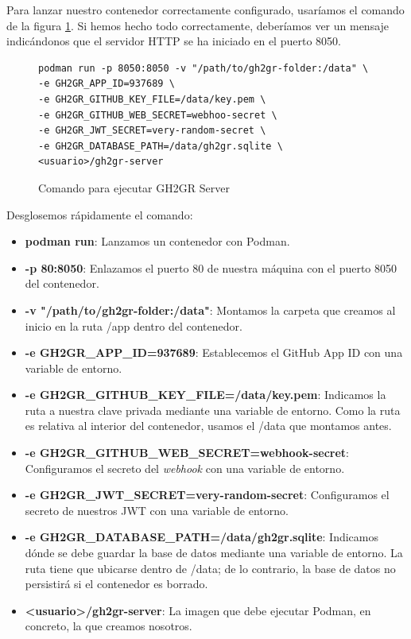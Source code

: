 \begin{sloppypar}
Para lanzar nuestro contenedor correctamente configurado, usaríamos el comando de la figura \ref{fig:run-server}. Si hemos hecho todo correctamente, deberíamos ver un mensaje indicándonos que el servidor \acrshort{HTTP} se ha iniciado en el puerto 8050.
\end{sloppypar}


\begin{figure}[H]
\begin{verbatim}
podman run -p 8050:8050 -v "/path/to/gh2gr-folder:/data" \
-e GH2GR_APP_ID=937689 \
-e GH2GR_GITHUB_KEY_FILE=/data/key.pem \
-e GH2GR_GITHUB_WEB_SECRET=webhoo-secret \
-e GH2GR_JWT_SECRET=very-random-secret \
-e GH2GR_DATABASE_PATH=/data/gh2gr.sqlite \
<usuario>/gh2gr-server
\end{verbatim}
\caption{Comando para ejecutar GH2GR Server}
\label{fig:run-server}
\end{figure}

Desglosemos rápidamente el comando:
\begin{itemize}
    \item \textbf{podman run}: Lanzamos un contenedor con Podman.
    \item \textbf{-p 80:8050}: Enlazamos el puerto 80 de nuestra máquina con el puerto 8050 del contenedor.
    \item \textbf{-v "/path/to/gh2gr-folder:/data"}: Montamos la carpeta que creamos al inicio en la ruta /app dentro del contenedor.
    \item \textbf{-e GH2GR\_APP\_ID=937689}: Establecemos el GitHub App ID con una variable de entorno.
    \item \textbf{-e GH2GR\_GITHUB\_KEY\_FILE=/data/key.pem}: Indicamos la ruta a nuestra clave privada mediante una variable de entorno. Como la ruta es relativa al interior del contenedor, usamos el /data que montamos antes.
    \item \textbf{-e GH2GR\_GITHUB\_WEB\_SECRET=webhook-secret}: Configuramos el secreto del \textit{webhook} con una variable de entorno.
    \item \textbf{-e GH2GR\_JWT\_SECRET=very-random-secret}: Configuramos el secreto de nuestros \acrshort{JWT} con una variable de entorno.
    \item \textbf{-e GH2GR\_DATABASE\_PATH=/data/gh2gr.sqlite}: Indicamos dónde se debe guardar la base de datos mediante una variable de entorno. La ruta tiene que ubicarse dentro de /data; de lo contrario, la base de datos no persistirá si el contenedor es borrado.
    \item \textbf{<usuario>/gh2gr-server}: La imagen que debe ejecutar Podman, en concreto, la que creamos nosotros.
\end{itemize}

